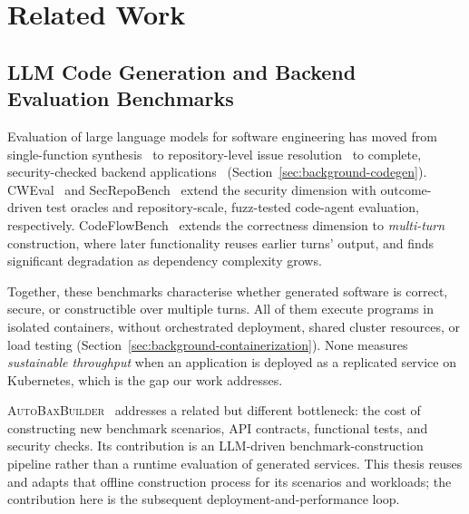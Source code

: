 
\chapter{Related Work}
\label{ch:related-work}


\section{LLM Code Generation and Backend Evaluation Benchmarks}
\label{sec:rw-benchmarks}

Evaluation of large language models for software engineering has moved from
single-function synthesis~\cite{chen2021humaneval,austin2021mbpp} to
repository-level issue resolution~\cite{jimenez2024swebench} to complete,
security-checked backend applications~\cite{vero2025baxbench}
(Section~\ref{sec:background-codegen}).  CWEval~\cite{peng2025cweval} and
SecRepoBench~\cite{shen2026secrepobench} extend the security dimension with
outcome-driven test oracles and repository-scale, fuzz-tested code-agent
evaluation, respectively.  CodeFlowBench~\cite{wang2025codeflowbench} extends
the correctness dimension to \emph{multi-turn} construction, where later
functionality reuses earlier turns' output, and finds significant
degradation as dependency complexity grows.

Together, these benchmarks characterise whether generated software is
correct, secure, or constructible over multiple turns.  All of them execute
programs in isolated containers, without orchestrated deployment, shared
cluster resources, or load testing (Section~\ref{sec:background-containerization}).
None measures \emph{sustainable throughput} when an application is deployed
as a replicated service on Kubernetes, which is the gap our work addresses.

\textsc{AutoBaxBuilder}~\cite{vonarx2025autobaxbuilder} addresses a related
but different bottleneck: the cost of constructing new benchmark scenarios,
API contracts, functional tests, and security checks. Its contribution is an
LLM-driven benchmark-construction pipeline rather than a runtime evaluation
of generated services. This thesis reuses and adapts that offline
construction process for its scenarios and workloads; the contribution here
is the subsequent deployment-and-performance loop.


